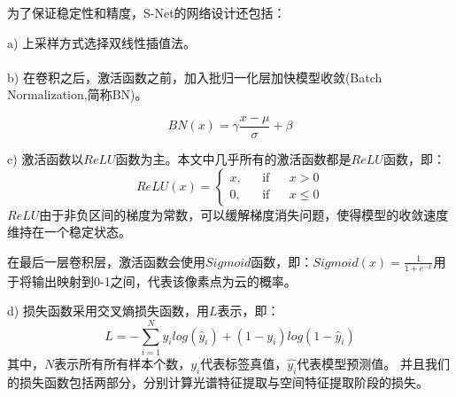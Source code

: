 \documentclass[10pt]{ctexart}
\newcommand{\upcite}[1]{\textsuperscript{\textsuperscript{\cite{#1}}}}
\begin{document}
\begin{multicols}{2}
为了保证稳定性和精度，S-Net的网络设计还包括：

a) 上采样方式选择双线性插值法。

b) 在卷积之后，激活函数之前，加入批归一化层\upcite{ioffe2015batch}加快模型收敛(Batch Normalization,简称BN)。

\begin{equation}
    {BN}(x) = \gamma\frac{x-\mu}{\sigma}+\beta
\end{equation}

c) 激活函数以$ReLU$函数为主。本文中几乎所有的激活函数都是$ReLU$函数，即：
\begin{equation}
    {ReLU}(x)=\left\{
    \begin{aligned}
        x, & &\text{if} & & x > 0 \\
        0, & &\text{if} & & x \leq 0
    \end{aligned}
    \right.
\end{equation}
$ReLU$由于非负区间的梯度为常数，可以缓解梯度消失问题，使得模型的收敛速度维持在一个稳定状态。

在最后一层卷积层，激活函数会使用$Sigmoid$函数，即：${Sigmoid}(x)=\frac{1}{1+e^{-x}}$用于将输出映射到0-1之间，代表该像素点为云的概率。

d) 损失函数采用交叉熵损失函数，用$L$表示，即：
\begin{equation}
    {L} = -\sum_{i=1}^N y_ilog(\hat{y}_i)+(1-y_i)log(1-\hat{y}_i)
\end{equation}
其中，$N$表示所有所有样本个数，$y_i$代表标签真值，$\hat{y_i}$代表模型预测值。
并且我们的损失函数包括两部分，分别计算光谱特征提取与空间特征提取阶段的损失。


\end{multicols}
\end{document}
